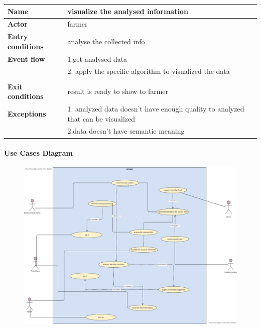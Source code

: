 \begin{table}[H]
\begin{tabular}{|l|l|}
\hline
\normalsize	
\textbf{Name} & visualize the analysed information \\\hline
\textbf{Actor} & farmer\\\hline
\textbf{Entry conditions} &  analyse the collected info  \\\hline
\textbf{Event flow} & 1.get analysed data \\&
2. apply the specific algorithm to visualized the data\\&
\\\hline
\textbf{Exit conditions} & result is ready to show to farmer  \\\hline
\textbf{Exceptions }& 
1. analyzed data doesn't have enough quality to analyzed that can be visualized \\&
2.data doesn't have semantic meaning 
\\\hline
\end{tabular}
\end{table}

\paragraph{Use Cases Diagram}

\begin{figure}[H]
\includegraphics[width=1\textwidth]{figures/usecase.jpg}
\end{figure}
